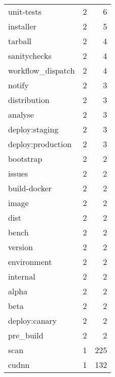 \begin{tabular}{lrr}
unit-tests                 &                   2 &             6 \\
installer                  &                   2 &             5 \\
tarball                    &                   2 &             4 \\
sanitychecks               &                   2 &             4 \\
workflow\_dispatch          &                   2 &             4 \\
notify                     &                   2 &             3 \\
distribution               &                   2 &             3 \\
analyse                    &                   2 &             3 \\
deploy:staging             &                   2 &             3 \\
deploy:production          &                   2 &             3 \\
bootstrap                  &                   2 &             2 \\
issues                     &                   2 &             2 \\
build-docker               &                   2 &             2 \\
image                      &                   2 &             2 \\
dist                       &                   2 &             2 \\
bench                      &                   2 &             2 \\
version                    &                   2 &             2 \\
environment                &                   2 &             2 \\
internal                   &                   2 &             2 \\
alpha                      &                   2 &             2 \\
beta                       &                   2 &             2 \\
deploy:canary              &                   2 &             2 \\
pre\_build                  &                   2 &             2 \\
scan                       &                   1 &           225 \\
cudnn                      &                   1 &           132 \\

\end{tabular}
